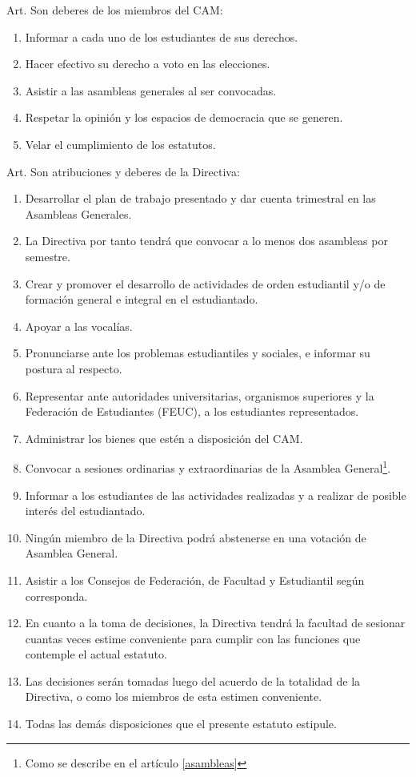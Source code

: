 \documentclass[letterpaper,11pt]{article}
\newcounter{art}
\newenvironment{art}{
    Art.\refstepcounter{art} \theart\:
}{}
\begin{document}
\begin{art}\label{deberesCAM}
    Son deberes de los miembros del CAM:
    \begin{enumerate}
        \item Informar a cada uno de los estudiantes de sus derechos.
        \item Hacer efectivo su derecho a voto en las elecciones.
        \item Asistir a las asambleas generales al ser convocadas.
        \item Respetar la opinión y los espacios de democracia que se generen.
        \item Velar el cumplimiento de los estatutos.
    \end{enumerate}
\end{art}

\begin{art}\label{funcionesDirectiva}
    Son atribuciones y deberes de la Directiva:
    \begin{enumerate}
        \item Desarrollar el plan de trabajo presentado y dar cuenta trimestral en las Asambleas Generales.
        \item La Directiva por tanto tendrá que convocar a lo menos dos asambleas por semestre.
        \item Crear y promover el desarrollo de actividades de orden estudiantil y/o de formación general e integral en el estudiantado.
        \item Apoyar a las vocalías.
        \item Pronunciarse ante los problemas estudiantiles y sociales, e informar su postura al respecto. %
        \item Representar ante autoridades universitarias, organismos superiores y la Federación de Estudiantes (FEUC), a los estudiantes representados.
        \item Administrar los bienes que estén a disposición del CAM.
        \item Convocar a sesiones ordinarias y extraordinarias de la Asamblea General\footnote{Como se describe en el artículo \ref{asambleas}}.
        \item Informar a los estudiantes de las actividades realizadas y a realizar de posible interés del estudiantado.
        \item Ningún miembro de la Directiva podrá abstenerse en una votación de Asamblea General.
        \item Asistir a los Consejos de Federación, de Facultad y Estudiantil según corresponda.
        \item En cuanto a la toma de decisiones, la Directiva tendrá la facultad de sesionar cuantas veces estime conveniente para cumplir con las funciones que contemple el actual estatuto.
        \item Las decisiones serán tomadas luego del acuerdo de la totalidad de la Directiva, o como los miembros de esta estimen conveniente.
        \item Todas las demás disposiciones que el presente estatuto estipule.
    \end{enumerate}
\end{art}
\end{document}
